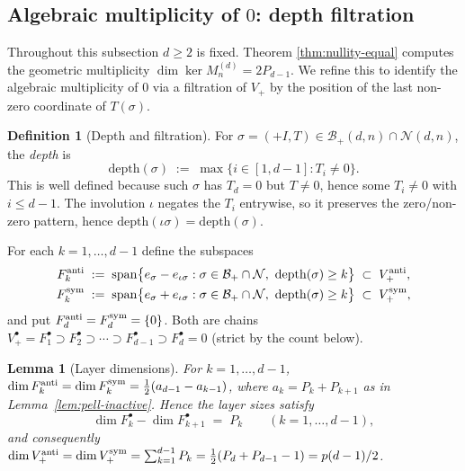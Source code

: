 \documentclass{amsart}
\newtheorem{lemma}[theorem]{Lemma}
\theoremstyle{definition}
\newtheorem{definition}[theorem]{Definition}
\theoremstyle{remark}
\begin{document}
\subsection{Algebraic multiplicity of $0$: depth filtration}
\label{ssec:alg-mult}

Throughout this subsection $d \ge 2$ is fixed.  Theorem
\ref{thm:nullity-equal} computes the geometric multiplicity
$\dim \ker M_n^{(d)} = 2 P_{d-1}$.  We refine this to
identify the algebraic multiplicity of $0$ via a filtration
of $V_+$ by the position of the last non-zero coordinate of
$T(\sigma)$.

\begin{definition}[Depth and filtration]\label{def:depth}
For $\sigma = (+I, T) \in \mathcal{B}_+(d, n) \cap
\mathcal{N}(d, n)$, the \emph{depth} is
\[
  \mathrm{depth}(\sigma)
  \;:=\; \max\bigl\{i \in [1, d-1] : T_i \neq 0\bigr\}.
\]
This is well defined because such $\sigma$ has $T_d = 0$ but
$T \neq 0$, hence some $T_i \neq 0$ with $i \le d-1$.  The
involution $\iota$ negates the $T_i$ entrywise, so it preserves
the zero/non-zero pattern, hence $\mathrm{depth}(\iota \sigma)
= \mathrm{depth}(\sigma)$.

For each $k = 1, \ldots, d-1$ define the subspaces
\begin{align*}
  F_k^{\rm anti} &\;:=\; \mathrm{span}\bigl\{e_\sigma -
       e_{\iota\sigma} : \sigma \in \mathcal{B}_+ \cap \mathcal{N},\
       \mathrm{depth}(\sigma) \ge k\bigr\}
       \;\subset\; V_+^{\rm anti},\\
  F_k^{\rm sym}  &\;:=\; \mathrm{span}\bigl\{e_\sigma +
       e_{\iota\sigma} : \sigma \in \mathcal{B}_+ \cap \mathcal{N},\
       \mathrm{depth}(\sigma) \ge k\bigr\}
       \;\subset\; V_+^{\rm sym},
\end{align*}
and put $F_d^{\rm anti} = F_d^{\rm sym} = \{0\}$.  Both are
chains
$V_+^\bullet = F_1^\bullet \supset F_2^\bullet \supset
\cdots \supset F_{d-1}^\bullet \supset F_d^\bullet = 0$
(strict by the count below).
\end{definition}

\begin{lemma}[Layer dimensions]\label{lem:depth-count}
For $k = 1, \ldots, d-1$, $\dim F_k^{\rm anti} = \dim
F_k^{\rm sym} = \tfrac12(a_{d-1} - a_{k-1})$, where $a_k =
P_k + P_{k+1}$ as in Lemma~\ref{lem:pell-inactive}.  Hence the
layer sizes satisfy
\begin{equation}\label{eq:layer-Pell}
  \dim F_k^\bullet - \dim F_{k+1}^\bullet \;=\; P_k
  \qquad (k = 1, \ldots, d-1),
\end{equation}
and consequently $\dim V_+^{\rm anti} = \dim V_+^{\rm sym} =
\sum_{k=1}^{d-1} P_k = \tfrac12(P_d + P_{d-1} - 1) = p(d-1)/2$.
\end{lemma}
\end{document}
